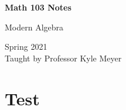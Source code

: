 \documentclass[letterpaper]{article}
\begin{document}
\begin{titlepage}
    \begin{center}
        \vspace*{1cm}
            
        \Huge
        \textbf{Math 103 Notes}
            
        \vspace{0.5cm}
        \LARGE
        Modern Algebra
            
        \vspace{1.5cm}
            
        \vfill
            
        Spring 2021\\
        Taught by Professor Kyle Meyer
    \end{center}
\end{titlepage}


\newpage 

\begingroup
    \renewcommand\contentsname{Table of Contents}
    \tableofcontents
\endgroup

\newpage
{}

\section{Test}
\end{document}
